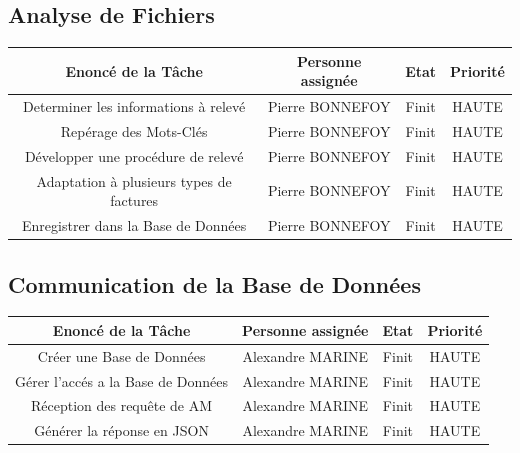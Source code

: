 \documentclass[a4paper, 11pt]{article}
\begin{document}
    \subsection{Analyse de Fichiers}
    \begin{center}
    \begin{tabular}{|c|c|c|c|}
        \hline
        Enoncé de la Tâche & Personne assignée & Etat & Priorité\\
        \hline
        \hline
        Determiner les informations à relevé  & Pierre BONNEFOY & Finit & HAUTE \\
        \hline
        Repérage des Mots-Clés & Pierre BONNEFOY & Finit & HAUTE  \\
        \hline
        Développer une procédure de relevé & Pierre BONNEFOY & Finit & HAUTE  \\
        \hline
        Adaptation à plusieurs types de factures & Pierre BONNEFOY & Finit & HAUTE  \\
        \hline
        Enregistrer dans la Base de Données & Pierre BONNEFOY & Finit & HAUTE  \\
        \hline
    \end{tabular}
    \end{center}

    \subsection{Communication de la Base de Données}
    \begin{center}
    \begin{tabular}{|c|c|c|c|}
        \hline
        Enoncé de la Tâche & Personne assignée & Etat & Priorité\\
        \hline
        \hline
        Créer une Base de Données  & Alexandre MARINE & Finit & HAUTE \\
        \hline
        Gérer l'accés a la Base de Données  & Alexandre MARINE & Finit & HAUTE \\
        \hline
        Réception des requête de AM  & Alexandre MARINE & Finit & HAUTE \\
        \hline
        Générer la réponse en JSON  & Alexandre MARINE & Finit & HAUTE \\
        \hline
    \end{tabular}
    \end{center}
\end{document}

